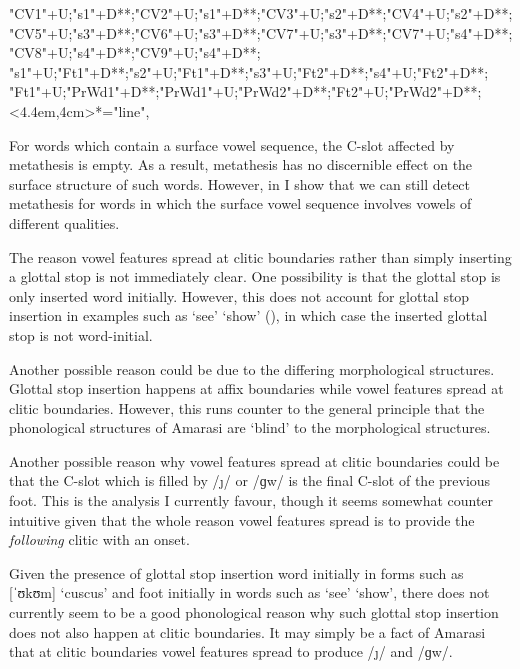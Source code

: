 \begin{multicols}{2}
\begin{exe}
{\begin{xlist}
{		"CV1"+U;"s1"+D**\dir{-};"CV2"+U;"s1"+D**\dir{-};"CV3"+U;"s2"+D**\dir{-};"CV4"+U;"s2"+D**\dir{-};
		"CV5"+U;"s3"+D**\dir{-};"CV6"+U;"s3"+D**\dir{-};"CV7"+U;"s3"+D**\dir{-};"CV7"+U;"s4"+D**\dir{-};"CV8"+U;"s4"+D**\dir{-};"CV9"+U;"s4"+D**\dir{-};
		"s1"+U;"Ft1"+D**\dir{-};"s2"+U;"Ft1"+D**\dir{-};"s3"+U;"Ft2"+D**\dir{-};"s4"+U;"Ft2"+D**\dir{-};
		"Ft1"+U;"PrWd1"+D**\dir{-};"PrWd1"+U;"PrWd2"+D**\dir{-};"Ft2"+U;"PrWd2"+D**\dir{-};
		<4.4em,4cm>*="line",
	\endxy}\label{as:niij=ee,kfuugw=ee2}
	\end{xlist}}
\end{exe}
\end{multicols}

\newpage
For words which contain a surface vowel sequence,
the C-slot affected by metathesis is empty.
As a result, metathesis has no discernible effect on the surface structure of such words.
However, in  I show that we can still detect metathesis
for words in which the surface vowel sequence involves vowels of different qualities.

The reason vowel features spread at clitic
boundaries rather than simply inserting a glottal stop is not immediately clear.
One possibility is that the glottal stop is only inserted word initially.
However, this does not account for glottal stop insertion in examples
such as  `see' {\ra}  `show' (),
in which case the inserted glottal stop is not word-initial.
\label{WhyNotGlottal?}

Another possible reason could be due to the differing morphological structures.
Glottal stop insertion happens at affix boundaries
while vowel features spread at clitic boundaries.
However, this runs counter to the general principle
that the phonological structures of Amarasi are `blind'
to the morphological structures.

Another possible reason why vowel features spread at clitic
boundaries could be that the C-slot which is filled by /\j/ or /ɡw/
is the final C-slot of the previous foot.
This is the analysis I currently favour,
though it seems somewhat counter intuitive
given that the whole reason vowel features spread is to
provide the \emph{following} clitic with an onset.

Given the presence of glottal stop insertion
word initially in forms such as  {\ra} [ˈʊkʊm] `cuscus'
and foot initially in words such as  `see' {\ra}  `show',
there does not currently seem to be a good phonological
reason why such glottal stop insertion does not also happen at clitic boundaries.
It may simply be a fact of Amarasi that at clitic
boundaries vowel features spread to produce /\j/ and /ɡw/.

